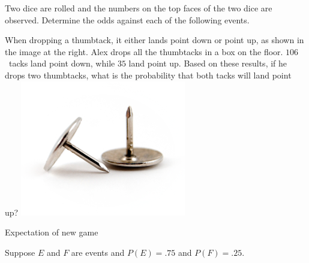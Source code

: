\documentclass[addpoints,12pt]{exam}
\begin{document}
\begin{questions}

\question[10] Two dice are rolled and the
numbers on the top faces of the two dice are observed.
Determine the odds against each of the following events.

\question[10]
\begin{multicols}{2}
When dropping a thumbtack, it either lands point down
or point up, as shown in the image at the right.
Alex drops all the thumbtacks in a box on the floor.
$106$~tacks land point down, while $35$ land point up.
Based on these results, if he drops two thumbtacks, what
is the probability that both tacks will land point up?
\includegraphics[scale=.5]{Thumbtacks}
\end{multicols}

\question[10] Expectation of new game

\question[10] Suppose $E$ and $F$ are events
and $P\left(E\right)=.75$ and $P\left(F\right)=.25$.
\end{questions}
\end{document}
